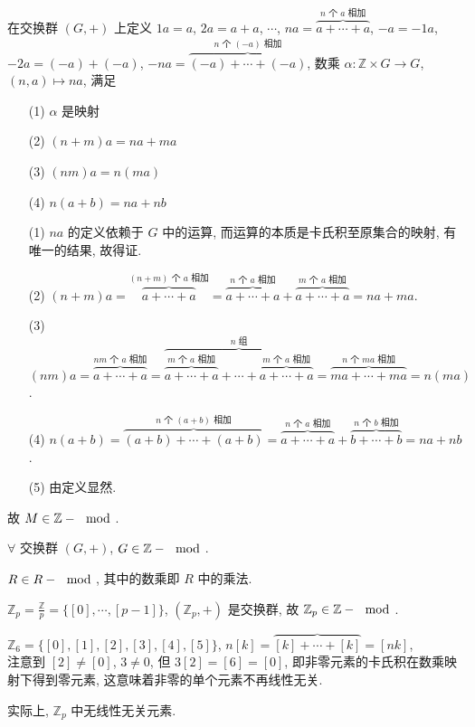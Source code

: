 \documentclass{note}
\begin{document}
\begin{eg}
    在交换群 $(G,+)$ 上定义 $1a=a$, $2a=a+a$, $\cdots$, $na=\overbrace{a+\cdots+a}^{\text{$n$ 个 $a$ 相加}}$, $-a=-1a$, $-2a=(-a)+(-a)$, $-na=\overbrace{(-a)+\cdots+(-a)}^{\text{$n$ 个 $(-a)$ 相加}}$, 数乘 $\alpha:\mathbb{Z}\times G\rightarrow G$, $(n,a)\mapsto na$, 满足
    \begin{itemize}
        \item[(1)] $\alpha$ 是映射
        \item[(2)] $(n+m)a=na+ma$
        \item[(3)] $(nm)a=n(ma)$
        \item[(4)] $n(a+b)=na+nb$
    \end{itemize}
    \begin{pf}
        \begin{itemize}
            \item[(1)] $na$ 的定义依赖于 $G$ 中的运算, 而运算的本质是卡氏积至原集合的映射, 有唯一的结果, 故得证.
            \item[(2)] $(n+m)a=\overbrace{a+\cdots+a}^{\text{$(n+m)$ 个 $a$ 相加}}=\overbrace{a+\cdots+a}^{\text{$n$ 个 $a$ 相加}}+\overbrace{a+\cdots+a}^{\text{$m$ 个 $a$ 相加}}=na+ma$.
            \item[(3)] $(nm)a=\overbrace{a+\cdots+a}^{\text{$nm$ 个 $a$ 相加}}=\overbrace{\overbrace{a+\cdots+a}^{\text{$m$ 个 $a$ 相加}}+\cdots+\overbrace{a+\cdots+a}^{\text{$m$ 个 $a$ 相加}}}^{\text{$n$ 组}}=\overbrace{ma+\cdots+ma}^{\text{$n$ 个 $ma$ 相加}}=n(ma)$.
            \item[(4)] $n(a+b)=\overbrace{(a+b)+\cdots+(a+b)}^{\text{$n$ 个 $(a+b)$ 相加}}=\overbrace{a+\cdots+a}^{\text{$n$ 个 $a$ 相加}}+\overbrace{b+\cdots+b}^{\text{$n$ 个 $b$ 相加}}=na+nb$.
            \item[(5)] 由定义显然.
        \end{itemize}
    \end{pf}
    故 $M\in\mathbb{Z}-\mod$.
\end{eg}

\begin{eg}
    $\forall$ 交换群 $(G,+)$, $G\in\mathbb{Z}-\mod$.
\end{eg}

\begin{eg}
    $R\in R-\mod$, 其中的数乘即 $R$ 中的乘法.
\end{eg}

\begin{eg}\label{module Zp}
    $\mathbb{Z}_p=\frac{\mathbb{Z}}{p}=\{[0],\cdots,[p-1]\}$, $(\mathbb{Z}_p,+)$ 是交换群, 故 $\mathbb{Z}_p\in\mathbb{Z}-\mod$.

    $\mathbb{Z}_6=\{[0],[1],[2],[3],[4],[5]\}$, $n[k]=\overbrace{[k]+\cdots+[k]}=[nk]$,\\
    注意到 $[2]\neq[0]$, $3\neq 0$, 但 $3[2]=[6]=[0]$, 即非零元素的卡氏积在数乘映射下得到零元素, 这意味着非零的单个元素不再线性无关.

    实际上, $\mathbb{Z}_p$ 中无线性无关元素.
\end{eg}
\end{document}
